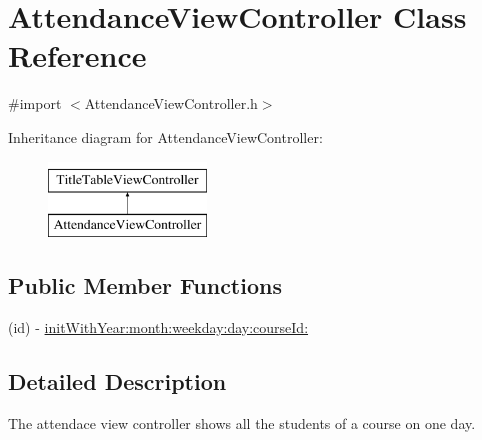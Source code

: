 \hypertarget{interface_attendance_view_controller}{\section{\-Attendance\-View\-Controller \-Class \-Reference}
\label{interface_attendance_view_controller}
}


{\ttfamily \#import $<$\-Attendance\-View\-Controller.\-h$>$}

\-Inheritance diagram for \-Attendance\-View\-Controller\-:\begin{figure}[H]
\begin{center}
\leavevmode
\includegraphics[height=2.000000cm]{interface_attendance_view_controller}
\end{center}
\end{figure}
\subsection*{\-Public \-Member \-Functions}
\begin{DoxyCompactItemize}
\item 
(id) -\/ \hyperlink{interface_attendance_view_controller_af8b1b06a44d046d768a3091ce56b93dd}{init\-With\-Year\-:month\-:weekday\-:day\-:course\-Id\-:}
\end{DoxyCompactItemize}


\subsection{\-Detailed \-Description}
\-The attendace view controller shows all the students of a course on one day. 

